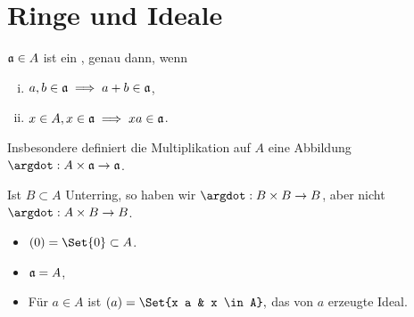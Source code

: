 %
%
%

\chapter{Ringe und Ideale}


\begin{df}
    $\frak a \in A$ ist ein , genau dann, wenn
    \begin{enumerate}[i)]
        \item
            $a, b \in \frak a \implies a + b \in \frak a$,
        \item
            $x \in A, x \in \frak a \implies x a \in \frak a$.
    \end{enumerate}
    Insbesondere definiert die Multiplikation auf $A$ eine Abbildung $\argdot: A \times \frak a \to \frak a$.
    \begin{note}
        Ist $B \subset A$ Unterring, so haben wir $\argdot: B \times B \to B$, aber nicht $\argdot: A \times B \to B$.
    \end{note}
\end{df}

\begin{ex}
    \begin{itemize}
        \item
            $(0) = \Set{0} \subset A$.
        \item
            $\frak a = A$,
        \item
            Für $a \in A$ ist
            \begin{math}
                (a) = \Set{x a & x \in A},
            \end{math}
            das von $a$ erzeugte Ideal.
    \end{itemize}
\end{ex}

